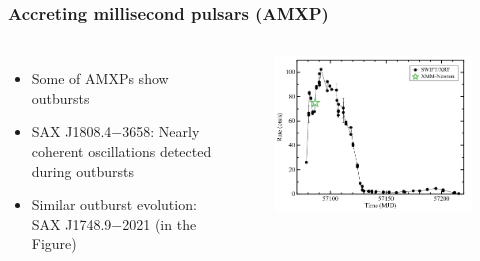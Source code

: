 \documentclass{beamer}
\begin{document}
\begin{frame}
\frametitle{Accreting millisecond pulsars (AMXP)}
\begin{columns}[c] %

\begin{itemize}
\item Some of AMXPs show outbursts
\item SAX J1808.4$-$3658: Nearly coherent oscillations detected during outbursts
\item Similar outburst evolution: SAX J1748.9$-$2021 (in the Figure)

\end{itemize}


\begin{figure}
\includegraphics[width=1.1\linewidth]{outburst.png}
\end{figure}

\end{columns}
\end{frame}


\end{document}
